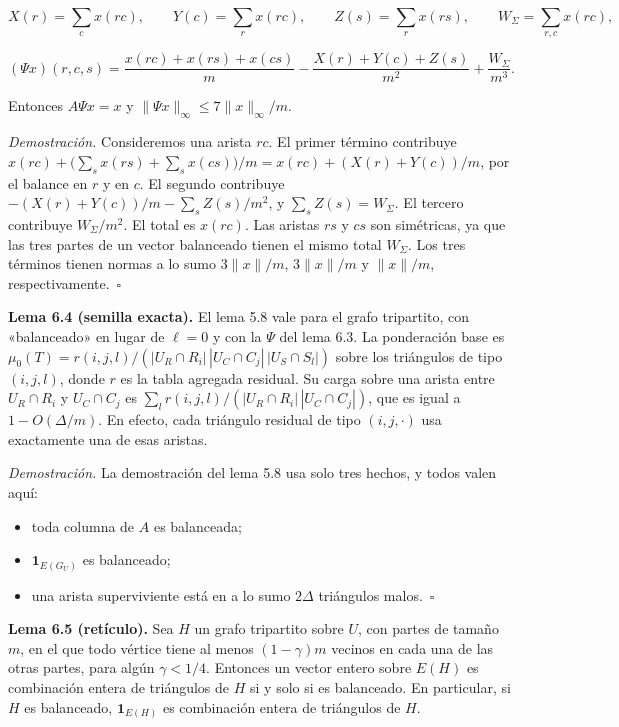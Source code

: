 \documentclass[spanish,11pt,a4paper]{article}
\providecommand{\tightlist}{\setlength{\itemsep}{0pt}\setlength{\parskip}{0pt}}
\begin{document}
\nopagebreak[4]
\[X(r)=\sum_c x(rc),\qquad Y(c)=\sum_r x(rc),\qquad Z(s)=\sum_r x(rs),\qquad W_\Sigma=\sum_{r,c}x(rc),\]

\nopagebreak[4]
\[(\Psi x)(r,c,s)=\frac{x(rc)+x(rs)+x(cs)}{m}-\frac{X(r)+Y(c)+Z(s)}{m^2}+\frac{W_\Sigma}{m^3}.\]

Entonces \(A\Psi x=x\) y \(\|\Psi x\|_\infty\le7\|x\|_\infty/m\).

\emph{Demostración.} Consideremos una arista \(rc\). El primer término contribuye \(x(rc)+\bigl(\sum_s x(rs)+\sum_s x(cs)\bigr)/m=x(rc)+(X(r)+Y(c))/m\), por el balance en \(r\) y en \(c\). El segundo contribuye \(-(X(r)+Y(c))/m-\sum_s Z(s)/m^2\), y \(\sum_s Z(s)=W_\Sigma\). El tercero contribuye \(W_\Sigma/m^2\). El total es \(x(rc)\). Las aristas \(rs\) y \(cs\) son simétricas, ya que las tres partes de un vector balanceado tienen el mismo total \(W_\Sigma\). Los tres términos tienen normas a lo sumo \(3\|x\|/m\), \(3\|x\|/m\) y \(\|x\|/m\), respectivamente.~\(\square\)

\textbf{Lema 6.4 (semilla exacta).} El lema 5.8 vale para el grafo tripartito, con «balanceado» en lugar de \(\ell=0\) y con la \(\Psi\) del lema 6.3. La ponderación base es \(\mu_0(T)=r(i,j,l)/(|U_R\cap R_i|\,|U_C\cap C_j|\,|U_S\cap S_l|)\) sobre los triángulos de tipo \((i,j,l)\), donde \(r\) es la tabla agregada residual. Su carga sobre una arista entre \(U_R\cap R_i\) y \(U_C\cap C_j\) es \(\sum_l r(i,j,l)/(|U_R\cap R_i|\,|U_C\cap C_j|)\), que es igual a \(1-O(\Delta/m)\). En efecto, cada triángulo residual de tipo \((i,j,\cdot)\) usa exactamente una de esas aristas.

\emph{Demostración.} La demostración del lema 5.8 usa solo tres hechos, y todos valen aquí:

\begin{itemize}
\tightlist
\item
  toda columna de \(A\) es balanceada;
\item
  \(\mathbf 1_{E(G_U)}\) es balanceado;
\item
  una arista superviviente está en a lo sumo \(2\Delta\) triángulos malos.~\(\square\)
\end{itemize}

\textbf{Lema 6.5 (retículo).} Sea \(H\) un grafo tripartito sobre \(U\), con partes de tamaño \(m\), en el que todo vértice tiene al menos \((1-\gamma)m\) vecinos en cada una de las otras partes, para algún \(\gamma<1/4\). Entonces un vector entero sobre \(E(H)\) es combinación entera de triángulos de \(H\) si y solo si es balanceado. En particular, si \(H\) es balanceado, \(\mathbf 1_{E(H)}\) es combinación entera de triángulos de \(H\).
\end{document}
